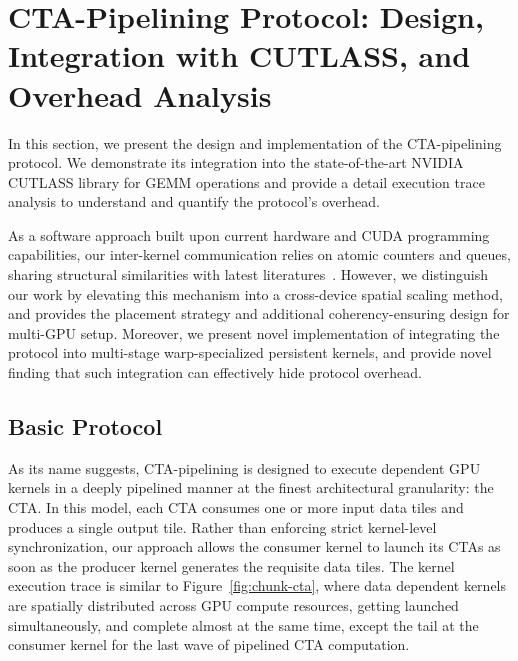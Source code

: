 \section{CTA-Pipelining Protocol: Design, Integration with CUTLASS, and Overhead Analysis}

In this section, we present the design and implementation of the CTA-pipelining protocol. We demonstrate its integration into the state-of-the-art NVIDIA CUTLASS library for GEMM operations and provide a detail execution trace analysis to understand and quantify the protocol's overhead.

As a software approach built upon current hardware and CUDA programming capabilities, our inter-kernel communication relies on atomic counters and queues, sharing structural similarities with latest literatures~\cite{cusync2024,davies2025kitsune}. However, we distinguish our work by elevating this mechanism into a cross-device spatial scaling method, and provides the placement strategy and additional coherency-ensuring design for multi-GPU setup. Moreover, we present novel implementation of integrating the protocol into multi-stage warp-specialized persistent kernels, and provide novel finding that such integration can effectively hide protocol overhead. 

\subsection{Basic Protocol}




As its name suggests, CTA-pipelining is designed to execute dependent GPU kernels in a deeply pipelined manner at the finest architectural granularity: the CTA. In this model, each CTA consumes one or more input data tiles and produces a single output tile. Rather than enforcing strict kernel-level synchronization, our approach allows the consumer kernel to launch its CTAs as soon as the producer kernel generates the requisite data tiles. The kernel execution trace is similar to Figure~\ref{fig:chunk-cta}, where data dependent kernels are spatially distributed across GPU compute resources, getting launched simultaneously, and complete almost at the same time, except the tail at the consumer kernel for the last wave of pipelined CTA computation. 

